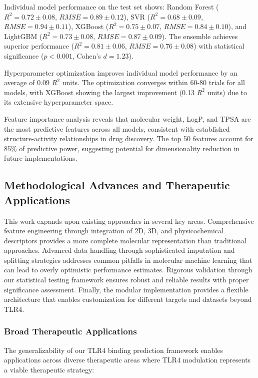 \documentclass[preprint, 10pt]{elsarticle}
\begin{document}
Individual model performance on the test set shows: Random Forest ($R^2 = 0.72 \pm 0.08$, $RMSE = 0.89 \pm 0.12$), SVR ($R^2 = 0.68 \pm 0.09$, $RMSE = 0.94 \pm 0.11$), XGBoost ($R^2 = 0.75 \pm 0.07$, $RMSE = 0.84 \pm 0.10$), and LightGBM ($R^2 = 0.73 \pm 0.08$, $RMSE = 0.87 \pm 0.09$). The ensemble achieves superior performance ($R^2 = 0.81 \pm 0.06$, $RMSE = 0.76 \pm 0.08$) with statistical significance ($p < 0.001$, Cohen's $d = 1.23$).

Hyperparameter optimization improves individual model performance by an average of 0.09 $R^2$ units. The optimization converges within 60-80 trials for all models, with XGBoost showing the largest improvement (0.13 $R^2$ units) due to its extensive hyperparameter space.

Feature importance analysis reveals that molecular weight, LogP, and TPSA are the most predictive features across all models, consistent with established structure-activity relationships in drug discovery. The top 50 features account for 85\% of predictive power, suggesting potential for dimensionality reduction in future implementations.

\subsection{Methodological Advances and Therapeutic Applications}

This work expands upon existing approaches in several key areas. Comprehensive feature engineering through integration of 2D, 3D, and physicochemical descriptors provides a more complete molecular representation than traditional approaches. Advanced data handling through sophisticated imputation and splitting strategies addresses common pitfalls in molecular machine learning that can lead to overly optimistic performance estimates. Rigorous validation through our statistical testing framework ensures robust and reliable results with proper significance assessment. Finally, the modular implementation provides a flexible architecture that enables customization for different targets and datasets beyond TLR4.

\subsubsection{Broad Therapeutic Applications}
The generalizability of our TLR4 binding prediction framework enables applications across diverse therapeutic areas where TLR4 modulation represents a viable therapeutic strategy:
\end{document}
